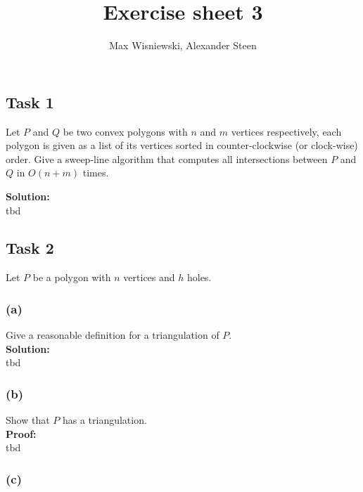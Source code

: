 \documentclass[11pt,a4paper,ngerman]{article}
\date{}
\title{Exercise sheet 3}
\author{Max Wisniewski, Alexander Steen}
\begin{document}

\renewcommand{\figurename}{Figure}

\maketitle
\thispagestyle{fancy}

\subsection*{Task 1}

Let $P$ and $Q$ be two convex polygons with $n$ and $m$ vertices respectively, each polygon is given as
a list of its vertices sorted in counter-clockwise (or clock-wise) order. Give a sweep-line algorithm
that computes all intersections between $P$ and $Q$ in $O(n + m)$ times.

\textbf{Solution:}\\

tbd

\subsection*{Task 2}
Let $P$ be a polygon with $n$ vertices and $h$ holes.

\subsubsection*{(a)}
Give a reasonable definition for a triangulation of $P$.\\

\textbf{Solution:}\\
tbd

\subsubsection*{(b)}
Show that $P$ has a triangulation.\\

\textbf{Proof:}\\

tbd

\subsubsection*{(c)}
\end{document}
